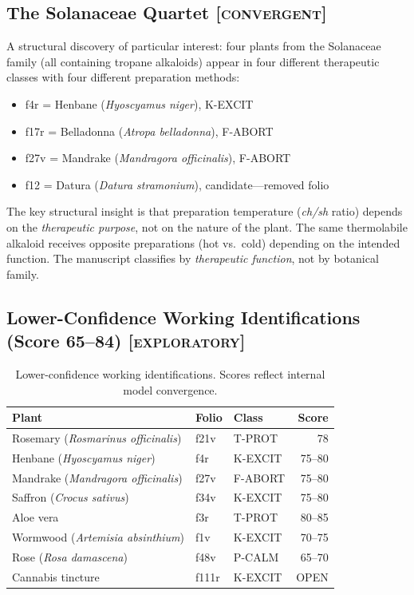 \documentclass[11pt,a4paper]{article}
\newcommand{\convergent}{\textsc{[convergent]}}
\newcommand{\exploratory}{\textsc{[exploratory]}}
\begin{document}
\subsection{The Solanaceae Quartet \convergent{}}

A structural discovery of particular interest: four plants from the Solanaceae family (all containing tropane alkaloids) appear in four different therapeutic classes with four different preparation methods:

\begin{itemize}[leftmargin=2em]
\item f4r = Henbane (\textit{Hyoscyamus niger}), K-EXCIT
\item f17r = Belladonna (\textit{Atropa belladonna}), F-ABORT
\item f27v = Mandrake (\textit{Mandragora officinalis}), F-ABORT
\item f12 = Datura (\textit{Datura stramonium}), candidate---removed folio
\end{itemize}

The key structural insight is that preparation temperature (\textit{ch/sh} ratio) depends on the \textit{therapeutic purpose}, not on the nature of the plant. The same thermolabile alkaloid receives opposite preparations (hot vs.\ cold) depending on the intended function. The manuscript classifies by \textit{therapeutic function}, not by botanical family.

\subsection{Lower-Confidence Working Identifications (Score 65--84) \exploratory{}}

\begin{table}[H]
\centering
\begin{tabular}{lllr}
\toprule
Plant & Folio & Class & Score \\
\midrule
Rosemary (\textit{Rosmarinus officinalis}) & f21v & T-PROT & 78 \\
Henbane (\textit{Hyoscyamus niger}) & f4r & K-EXCIT & 75--80 \\
Mandrake (\textit{Mandragora officinalis}) & f27v & F-ABORT & 75--80 \\
Saffron (\textit{Crocus sativus}) & f34v & K-EXCIT & 75--80 \\
Aloe vera & f3r & T-PROT & 80--85 \\
Wormwood (\textit{Artemisia absinthium}) & f1v & K-EXCIT & 70--75 \\
Rose (\textit{Rosa damascena}) & f48v & P-CALM & 65--70 \\
Cannabis tincture & f111r & K-EXCIT & OPEN \\
\bottomrule
\end{tabular}
\caption{Lower-confidence working identifications. Scores reflect internal model convergence.}
\end{table}
\end{document}
